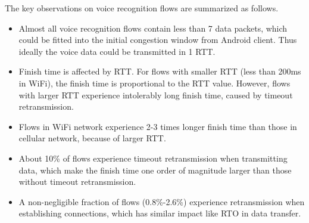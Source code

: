 The key observations on voice recognition flows are summarized as follows.
\begin{itemize}
	\item Almost all voice recognition flows contain less than 7 data packets, which could be fitted into the initial congestion window from Android client. Thus ideally the voice data could be transmitted in 1 RTT.
	\item Finish time is affected by RTT. For flows with smaller RTT (less than 200ms in WiFi), the finish time is proportional to the RTT value. However, flows with larger RTT experience intolerably long finish time, caused by timeout retransmission.
	\item Flows in WiFi network experience 2-3 times longer finish time than those in cellular network, because of larger RTT.
	\item About 10\% of flows experience timeout retransmission when transmitting data, which make the finish time one order of magnitude larger than those without timeout retransmission.
	\item A non-negligible fraction of flows (0.8\%-2.6\%) experience retransmission when establishing connections, which has similar impact like RTO in data transfer.
\end{itemize}